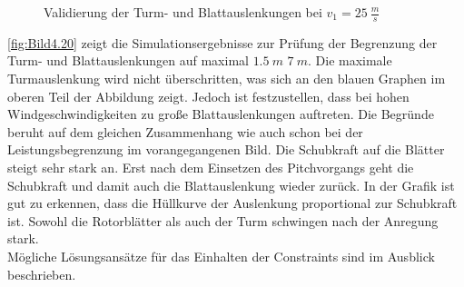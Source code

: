 \begin{figure}[H]
   \centering
   \caption[Constraint Turm- und Blattauslenkung]{Validierung der Turm- und Blattauslenkungen bei $v_1 = \SI{25}{\frac{m}{s}}$}
   \label{fig:Bild4.20}
\end{figure}

\autoref{fig:Bild4.20} zeigt die Simulationsergebnisse zur Prüfung der Begrenzung der Turm- und Blattauslenkungen auf maximal $\SI{1.5}{m}$ \bzw $\SI{7}{m}$. Die maximale Turmauslenkung wird nicht überschritten, was sich an den blauen Graphen im oberen Teil der Abbildung zeigt. Jedoch ist festzustellen, dass bei hohen Windgeschwindigkeiten zu große Blattauslenkungen auftreten. Die Begründe beruht auf dem gleichen Zusammenhang wie auch schon bei der Leistungsbegrenzung im vorangegangenen Bild. Die Schubkraft auf die Blätter steigt sehr stark an. Erst nach dem Einsetzen des Pitchvorgangs geht die Schubkraft und damit auch die Blattauslenkung wieder zurück. In der Grafik ist gut zu erkennen, dass die Hüllkurve der Auslenkung proportional zur Schubkraft ist. Sowohl die Rotorblätter als auch der Turm schwingen nach der Anregung stark.\\

Mögliche Lösungsansätze für das Einhalten der Constraints sind im Ausblick beschrieben.